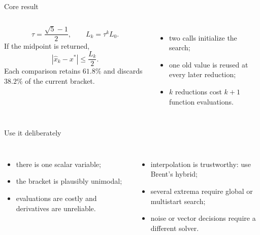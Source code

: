 \documentclass[aspectratio=169,11pt,t]{beamer}
\begin{document}
\begin{frame}{Core result}
  \begin{columns}[T,onlytextwidth]
      \[
        \tau=\frac{\sqrt5-1}{2},
        \qquad
        L_k=\tau^kL_0.
      \]
      If the midpoint is returned,
      \[
        |\widehat{x}_k-x^*|\le\frac{L_k}{2}.
      \]
      Each comparison retains \(61.8\%\) and discards \(38.2\%\) of the
      current bracket.

      \begin{itemize}
        \item two calls initialize the search;
        \item one old value is reused at every later reduction;
        \item \(k\) reductions cost \(k+1\) function evaluations.
      \end{itemize}
  \end{columns}

  \vspace{0.12cm}
\end{frame}

\begin{frame}{Use it deliberately}
  \begin{columns}[T,onlytextwidth]
      \begin{itemize}\setlength{\itemsep}{0.05cm}
        \item there is one scalar variable;
        \item the bracket is plausibly unimodal;
        \item evaluations are costly and derivatives are unreliable.
      \end{itemize}

      \begin{itemize}\setlength{\itemsep}{0.05cm}
        \item interpolation is trustworthy: use Brent's hybrid;
        \item several extrema require global or multistart search;
        \item noise or vector decisions require a different solver.
      \end{itemize}
  \end{columns}

  \vspace{0.08cm}
\end{frame}
\end{document}

